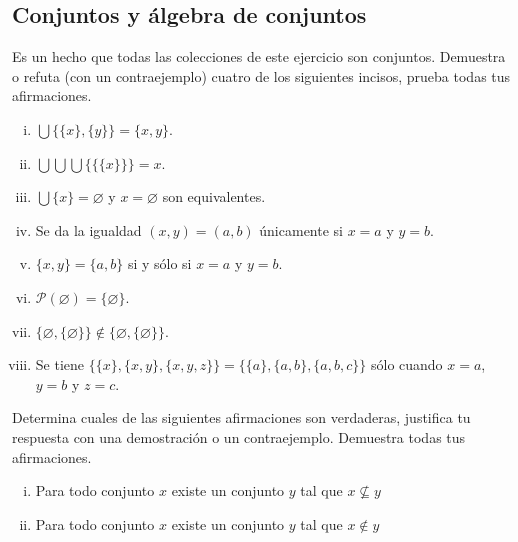 \documentclass[10pt]{article}
\newcommand{\set}[1]{\{#1\}}
\newcommand{\ms}[1]{\mathscr{#1}}
\renewcommand{\emptyset}{\varnothing}
\begin{document}
    \begin{flushright}
        \subsection*{Conjuntos y álgebra de conjuntos}
    \end{flushright}

    \begin{exercise}
        Es un hecho que todas las colecciones de este ejercicio son conjuntos. Demuestra o refuta (con un contraejemplo) cuatro de los siguientes incisos, prueba todas tus afirmaciones.
        \begin{multicols}{2}
            \begin{enumerate}[i)]
                \item \( \bigcup \set{\set{x},\set{y}}=\set{x,y} \).
                \item \( \bigcup\bigcup\bigcup\set{\set{\set{x}}} = x \).
                \item \( \bigcup \set{x}=\emptyset \) y $x=\emptyset$ son equivalentes.
                \item Se da la igualdad \( (x,y)=(a,b) \) únicamente si \(x=a\) y \(y=b\).
                \item \( \set{x,y}=\set{a,b} \) si y sólo si $x=a$ y $y=b$.
                \item \( \ms{P}(\emptyset)=\set{\emptyset} \).
                \item \( \set{\emptyset,\set{\emptyset}} \notin \set{\emptyset,\set{\emptyset}} \).
                \item Se tiene \( \set{\set{x},\set{x,y},\set{x,y,z}} = \set{\set{a},\set{a,b},\set{a,b,c}} \) sólo cuando \(x=a\), \(y=b\) y \(z=c\).
                
            \end{enumerate}
        \end{multicols}
    \end{exercise}

    \begin{exercise}
        Determina cuales de las siguientes afirmaciones son verdaderas, justifica tu respuesta con una demostración o un contraejemplo. Demuestra todas tus afirmaciones.
        \begin{enumerate}[i)]
            \item Para todo conjunto \(x\) existe un conjunto \(y\) tal que \(x \not\subseteq y\)
            \item Para todo conjunto \(x\) existe un conjunto \(y\) tal que \(x \notin y\)
        \end{enumerate}
    \end{exercise}
\end{document}
